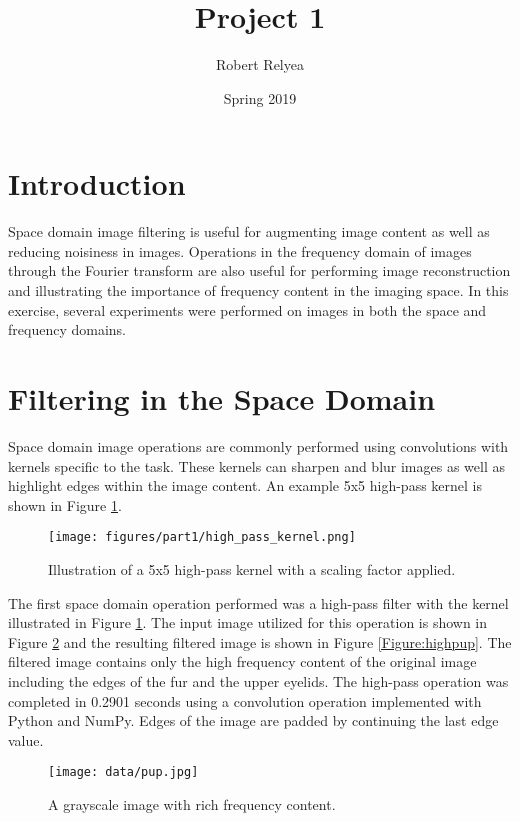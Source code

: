 \documentclass{article}
\title{Project 1}
\author{Robert Relyea}
\date{Spring 2019}
\begin{document}
\maketitle

\section{Introduction}
Space domain image filtering is useful for augmenting image content as well as reducing noisiness in images. Operations in the frequency domain of images through the Fourier transform are also useful for performing image reconstruction and illustrating the importance of frequency content in the imaging space. In this exercise, several experiments were performed on images in both the space and frequency domains.


\section{Filtering in the Space Domain}
Space domain image operations are commonly performed using convolutions with kernels specific to the task. These kernels can sharpen and blur images as well as highlight edges within the image content. An example 5x5 high-pass kernel is shown in Figure \ref{Figure:highpass}.

\begin{figure}[!ht]
  \centering
  \texttt{[image: figures/part1/high\_pass\_kernel.png]}
  \caption{Illustration of a 5x5 high-pass kernel with a scaling factor applied. }
  \label{Figure:highpass}
\end{figure}

The first space domain operation performed was a high-pass filter with the kernel illustrated in Figure \ref{Figure:highpass}. The input image utilized for this operation is shown in Figure \ref{Figure:pup} and the resulting filtered image is shown in Figure \ref{Figure:highpup}. The filtered image contains only the high frequency content of the original image including the edges of the fur and the upper eyelids. The high-pass operation was completed in 0.2901 seconds using a convolution operation implemented with Python and NumPy. Edges of the image are padded by continuing the last edge value.

\begin{figure}[!ht]
  \centering
  \texttt{[image: data/pup.jpg]}
  \caption{A grayscale image with rich frequency content. }
  \label{Figure:pup}
\end{figure}
\end{document}
